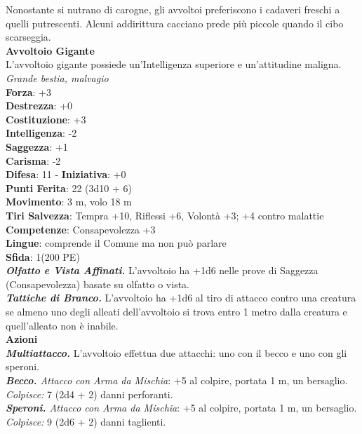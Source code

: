 \begin{multicols}{2}
Nonostante si nutrano di carogne, gli avvoltoi preferiscono i cadaveri freschi a quelli putrescenti. Alcuni addirittura cacciano prede più piccole quando il cibo scarseggia.\\

\medskip\textbf{Avvoltoio Gigante}\\
L'avvoltoio gigante possiede un'Intelligenza superiore e un'attitudine maligna.\\
\emph{Grande bestia, malvagio}\\
\textbf{Forza}: +3\\
\textbf{Destrezza}: +0\\
\textbf{Costituzione}: +3\\
\textbf{Intelligenza}: -2\\
\textbf{Saggezza}: +1\\
\textbf{Carisma}: -2\\
\textbf{Difesa}: 11 - \textbf{Iniziativa}: +0\\
\textbf{Punti Ferita}: 22 (3d10 + 6)\\
\textbf{Movimento}: 3 m, volo 18 m\\
\textbf{Tiri Salvezza}: Tempra +10, Riflessi +6, Volontà +3; +4 contro malattie\\
\textbf{Competenze}: Consapevolezza +3\\
\textbf{Lingue}: comprende il Comune ma non può parlare\\
\textbf{Sfida}: 1(200 PE)\smallskip\\
\emph{\textbf{Olfatto e Vista Affinati.}} L'avvoltoio ha +1d6 nelle prove di Saggezza (Consapevolezza) basate su olfatto o vista.\\
\emph{\textbf{Tattiche di Branco.}} L'avvoltoio ha +1d6 al tiro di attacco contro una creatura se almeno uno degli alleati dell'avvoltoio si trova entro 1 metro dalla creatura e quell'alleato non è inabile.\\
\smallskip\textbf{Azioni}\\
\emph{\textbf{Multiattacco.}} L'avvoltoio effettua due attacchi: uno con il becco e uno con gli speroni.\\
\emph{\textbf{Becco.} Attacco con Arma da Mischia}: +5 al colpire, portata 1 m, un bersaglio.\\
\emph{Colpisce:} 7 (2d4 + 2) danni perforanti.\\
\emph{\textbf{Speroni.} Attacco con Arma da Mischia}: +5 al colpire, portata 1 m, un bersaglio.\\
\emph{Colpisce:} 9 (2d6 + 2) danni taglienti.\\

\end{multicols}
